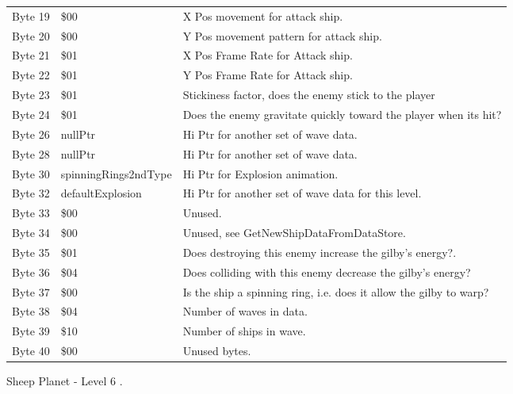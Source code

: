 \begin{figure}[H]
{\begin{adjustbox}{width=12cm}
\begin{tabular}{lll}
 Byte 19 & \$00                       & X Pos movement for attack ship.                                    \\
 Byte 20 & \$00                       & Y Pos movement pattern for attack ship.                            \\
 Byte 21 & \$01                       & X Pos Frame Rate for Attack ship.                                  \\
 Byte 22 & \$01                       & Y Pos Frame Rate for Attack ship.                                  \\
 Byte 23 & \$01                       & Stickiness factor, does the enemy stick to the player              \\
 Byte 24 & \$01                       & Does the enemy gravitate quickly toward the player when its hit?   \\
 Byte 26 & nullPtr                   & Hi Ptr for another set of wave data.                               \\
 Byte 28 & nullPtr                   & Hi Ptr for another set of wave data.                               \\
 Byte 30 & spinningRings2ndType      & Hi Ptr for Explosion animation.                                    \\
 Byte 32 & defaultExplosion          & Hi Ptr for another set of wave data for this level.                \\
 Byte 33 & \$00                       & Unused.                                                            \\
 Byte 34 & \$00                       & Unused, see GetNewShipDataFromDataStore.                           \\
 Byte 35 & \$01                       & Does destroying this enemy increase the gilby's energy?.           \\
 Byte 36 & \$04                       & Does colliding with this enemy decrease the gilby's energy?        \\
 Byte 37 & \$00                       & Is the ship a spinning ring, i.e. does it allow the gilby to warp? \\
 Byte 38 & \$04                       & Number of waves in data.                                           \\
 Byte 39 & \$10                       & Number of ships in wave.                                           \\
 Byte 40 & \$00                       & Unused bytes.                                                      \\
\bottomrule
\end{tabular}

  \end{adjustbox}

  }\caption*{Sheep Planet - Level 6
.}
\end{figure}

